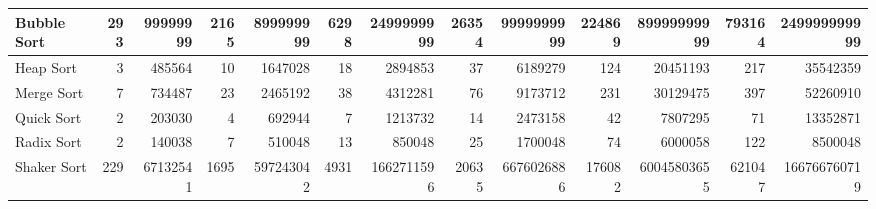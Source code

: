 \documentclass{article}
\begin{document}
\begin{table}[H]
\begin{adjustbox}{width=\columnwidth,center}
\begin{tabular}{|l|rrrrrrrrrrrr|}
Bubble Sort                        & \multicolumn{1}{r|}{293}          & \multicolumn{1}{r|}{99999999}   & \multicolumn{1}{r|}{2165}         & \multicolumn{1}{r|}{899999999}  & \multicolumn{1}{r|}{6298}         & \multicolumn{1}{r|}{2499999999} & \multicolumn{1}{r|}{26354}        & \multicolumn{1}{r|}{9999999999} & \multicolumn{1}{r|}{224869}       & \multicolumn{1}{r|}{89999999999} & \multicolumn{1}{r|}{793164}       & 249999999999                    \\ \hline
Heap Sort                          & \multicolumn{1}{r|}{3}            & \multicolumn{1}{r|}{485564}     & \multicolumn{1}{r|}{10}           & \multicolumn{1}{r|}{1647028}    & \multicolumn{1}{r|}{18}           & \multicolumn{1}{r|}{2894853}    & \multicolumn{1}{r|}{37}           & \multicolumn{1}{r|}{6189279}    & \multicolumn{1}{r|}{124}          & \multicolumn{1}{r|}{20451193}    & \multicolumn{1}{r|}{217}          & 35542359                        \\ \hline
Merge Sort                         & \multicolumn{1}{r|}{7}            & \multicolumn{1}{r|}{734487}     & \multicolumn{1}{r|}{23}           & \multicolumn{1}{r|}{2465192}    & \multicolumn{1}{r|}{38}           & \multicolumn{1}{r|}{4312281}    & \multicolumn{1}{r|}{76}           & \multicolumn{1}{r|}{9173712}    & \multicolumn{1}{r|}{231}          & \multicolumn{1}{r|}{30129475}    & \multicolumn{1}{r|}{397}          & 52260910                        \\ \hline
Quick Sort & \multicolumn{1}{r|}{2}            & \multicolumn{1}{r|}{203030}     & \multicolumn{1}{r|}{4}            & \multicolumn{1}{r|}{692944}     & \multicolumn{1}{r|}{7}            & \multicolumn{1}{r|}{1213732}    & \multicolumn{1}{r|}{14}           & \multicolumn{1}{r|}{2473158}    & \multicolumn{1}{r|}{42}           & \multicolumn{1}{r|}{7807295}     & \multicolumn{1}{r|}{71}           & 13352871                        \\ \hline
Radix Sort                         & \multicolumn{1}{r|}{2}            & \multicolumn{1}{r|}{140038}     & \multicolumn{1}{r|}{7}            & \multicolumn{1}{r|}{510048}     & \multicolumn{1}{r|}{13}           & \multicolumn{1}{r|}{850048}     & \multicolumn{1}{r|}{25}           & \multicolumn{1}{r|}{1700048}    & \multicolumn{1}{r|}{74}           & \multicolumn{1}{r|}{6000058}     & \multicolumn{1}{r|}{122}          & 8500048                         \\ \hline
Shaker Sort                        & \multicolumn{1}{r|}{229}          & \multicolumn{1}{r|}{67132541}   & \multicolumn{1}{r|}{1695}         & \multicolumn{1}{r|}{597243042}  & \multicolumn{1}{r|}{4931}         & \multicolumn{1}{r|}{1662711596} & \multicolumn{1}{r|}{20635}        & \multicolumn{1}{r|}{6676026886} & \multicolumn{1}{r|}{176082}       & \multicolumn{1}{r|}{60045803655} & \multicolumn{1}{r|}{621047}       & 166766760719                    \\ \hline

\end{tabular}
\end{adjustbox}
\end{table}
\end{document}

